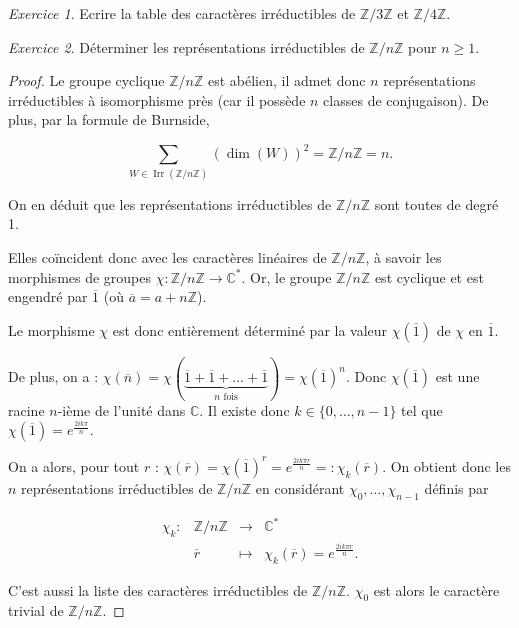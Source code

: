 \documentclass[french]{book}
\theoremstyle{definition}
\theoremstyle{remark}
\newtheorem{exo}{Exercice}
\begin{document}
\begin{exo}
  Ecrire la table des caractères irréductibles de \(\mathbb{Z}/{ 3 }\mathbb{Z}\) et \(\mathbb{Z}/{ 4 }\mathbb{Z}\).
\end{exo}

\begin{exo}
  Déterminer les représentations irréductibles de \(\mathbb{Z}/{n}\mathbb{Z}\) pour \(n \geq 1\).
\end{exo}

\begin{proof}
  Le groupe cyclique \(\mathbb{Z}/{ n }\mathbb{Z}\) est abélien, il admet donc \(n\) représentations irréductibles à isomorphisme près (car il possède \(n\) classes de conjugaison). De plus, par la formule de Burnside,

  \[\sum_{W \in \operatorname{Irr}(\mathbb{Z}/{ n }\mathbb{Z})} (\operatorname{dim}(W)) ^2 = \mathbb{Z}/{ n }\mathbb{Z} = n.\]

  On en déduit que les représentations irréductibles de \(\mathbb{Z}/{ n }\mathbb{Z}\) sont toutes de degré 1.

  Elles co\"incident donc avec les caractères linéaires de \(\mathbb{Z}/{n}\mathbb{Z}\), à savoir les morphismes de groupes \(\chi : \mathbb{Z}/{ n }\mathbb{Z} \longrightarrow \mathbb{C} ^{*}\). Or, le groupe \(\mathbb{Z}/{n}\mathbb{Z}\) est cyclique et est engendré par \(\overline{1}\) (où \(\overline{a} = a + n \mathbb{Z}\)).

  Le morphisme \(\chi\) est donc entièrement déterminé par la valeur \(\chi(\overline{1})\) de \(\chi\) en \(\overline{1}\).

  De plus, on a : \(\chi(\overline{n}) = \chi(\underbrace{\overline{1} + \overline{1} + \dots + \overline{1}}_{n \text{ fois}}) = \chi(\overline{1})^{n}\). Donc \(\chi(\overline{1})\) est une racine \(n\)-ième de l'unité dans \(\mathbb{C}\). Il existe donc \(k \in \{ 0, \dots, n-1 \} \) tel que \(\chi(\overline{1}) = e^{\frac{2 i k \pi}{n}}\).

  On a alors, pour tout \(r\) : \(\chi(\overline{r}) = \chi(\overline{1}) ^{r} = e^{\frac{2 i k \pi r}{n}}=: \chi_k(\overline{r})\). On obtient donc les \(n\) représentations irréductibles de \(\mathbb{Z}/{n}\mathbb{Z}\) en considérant \(\chi_0, \dots, \chi _{n-1}\) définis par

  \[\begin{matrix}
  \chi_k : & \mathbb{Z}/{n}\mathbb{Z} & \longrightarrow & \mathbb{C}^{*} \\
  \ & \overline{r}  & \longmapsto & \chi_k(\overline{r}) = e^{\frac{2 i k \pi r}{n}}.
  \end{matrix}\]

  C'est aussi la liste des caractères irréductibles de \(\mathbb{Z}/{n}\mathbb{Z}\). \(\chi_0\) est alors le caractère trivial de \(\mathbb{Z}/{n}\mathbb{Z}\).
\end{proof}
\end{document}
